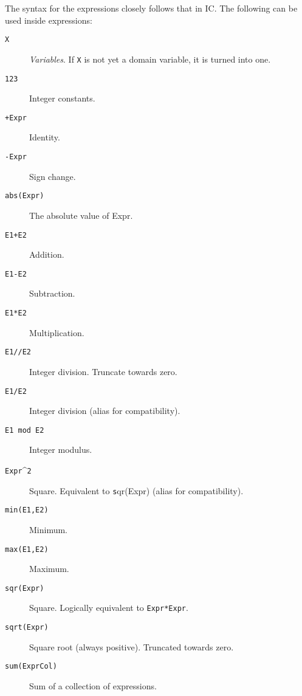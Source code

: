 The syntax for the expressions closely follows that in IC. The 
following can be used inside expressions:

\begin{description}
\item[\texttt{X}]
	    \emph{Variables}.  If \verb'X' is not yet a domain variable, it is turned 
	    into one.

   \item[\texttt{123}]
	    Integer constants.

   \item[\texttt{+Expr}]
	    Identity.

   \item[\texttt{-Expr}]
	    Sign change.

\item[\texttt{abs(Expr)}]
    The absolute value of Expr.

\item[\texttt{E1+E2}]
    Addition.

\item[\texttt{E1-E2}]
    Subtraction.

\item[\texttt{E1*E2}]
    Multiplication.

\item[\texttt{E1//E2}]
    Integer division. Truncate towards zero.

\item[\texttt{E1/E2}]
    Integer division (alias for compatibility).

\item[\texttt{E1 mod E2}]
	    Integer modulus.

\item[\texttt{Expr}\textasciicircum{}{\texttt 2}]
	    Square. Equivalent to {\texttt sqr(Expr)} (alias for compatibility).


\item[\texttt{min(E1,E2)}]
    Minimum.

\item[\texttt{max(E1,E2)}]
    Maximum.

\item[\texttt{sqr(Expr)}]
    Square. Logically equivalent to \verb|Expr*Expr|.

\item[\texttt{sqrt(Expr)}]
	    Square root (always positive). Truncated towards zero.

\item[\texttt{sum(ExprCol)}]
	    Sum of a collection of expressions.


\end{description}
